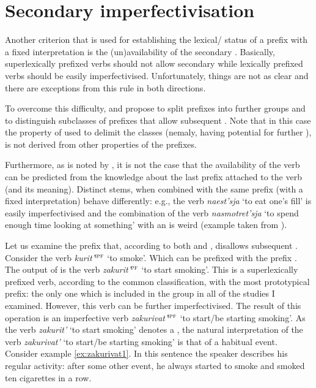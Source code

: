 \section{Secondary imperfectivisation}\label{section:new:imperfectivization}
Another criterion that is used for establishing the lexical/ status of a prefix with a fixed interpretation is the (un)availability of the secondary . Basically, superlexically prefixed verbs should not allow secondary  while lexically prefixed verbs should be easily imperfectivised. Unfortunately, things are not as clear and there are exceptions from this rule in both directions. 

To overcome this difficulty, \citet{Svenonius:04b} and \citet{Tatevosov:07, Tatevosov:09} propose to split  prefixes into further groups and to distinguish subclasses of  prefixes that allow subsequent . Note that in this case the property of used to delimit the classes (nemaly, having potential for further ), is not derived from other properties of the prefixes.

Furthermore, as is noted by \citet[35]{Kagan:book}, it is not the case that the availability of the  verb can be predicted from the knowledge about the last prefix attached to the verb (and its meaning). Distinct stems, when combined with the same prefix (with a fixed interpretation) behave differently: e.g., the verb \textit{naest’sja} `to eat one's fill' is easily imperfectivised and the combination of the verb \textit{nasmotret'sja} `to spend enough time looking at something' with an  is weird (example taken from \citealt[35]{Kagan:book}).

Let us examine the  prefix  that, according to both \citet[230]{Svenonius:04b} and \citet[116]{Tatevosov:09}, disallows subsequent . Consider the verb \textit{kurit'}$^{\textsc{ipf}}$ `to smoke'. Which can be prefixed with the  prefix {.} The output of  is the verb \textit{zakurit'}$^{\textsc{pf}}$ `to start smoking'. This is a superlexically prefixed verb, according to the common classification, with the most prototypical  prefix: the only one which is included in the  group in all of the studies I examined. However, this verb can be further imperfectivised. The result of this operation is an imperfective verb \textit{zakurivat'}$^{\textsc{ipf}}$ `to start/be starting smoking'. As the verb \textit{zakurit'} `to start smoking' denotes a , the natural interpretation of the verb \textit{zakurivat'} `to start/be starting smoking'  is that of a habitual event. Consider example \ref{ex:zakurivat1}. In this sentence the speaker describes his regular activity: after some other event, he always started to smoke and smoked ten cigarettes in a row.\largerpage

